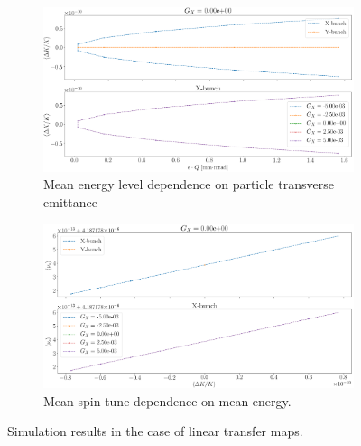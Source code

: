 \begin{figure}[h]
\centering
\begin{subfigure}{\linewidth}
\includegraphics[width=\linewidth]{images/stune_traj_equ/part1/equ_energy_vs_emittance_linear}
\caption{Mean energy level dependence on
particle transverse emittance\label{fig:stune_traj_equ_linear:nrg_vs_emittance}}
\end{subfigure} 
\begin{subfigure}{\linewidth}
\includegraphics[width=\linewidth]{images/stune_traj_equ/part1/stune_vs_equ_energy_linear}
\caption{Mean spin tune dependence on mean energy.\label{fig:stune_traj_equ_linear:stune_vs_nrg}}
\end{subfigure} 
\caption{Simulation results in the case of linear transfer maps.}
\end{figure}

